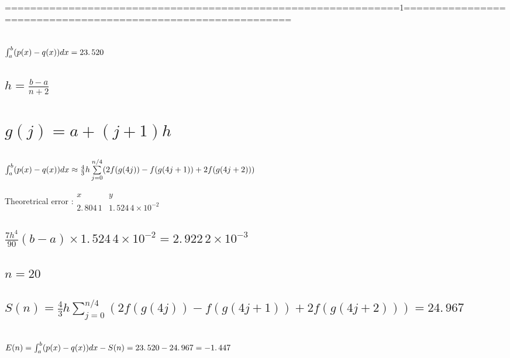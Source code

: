 \documentclass{article}
\begin{document}
\bigskip

\bigskip

==============================================================1=============================================================

\subsection{ $\protect\int_{a}^{b}(p(x)-q(x))dx=\allowbreak 23.\,\allowbreak
520$}

\subsection{$h=\frac{b-a}{n+2}$}

\section{$g(j)=a+(j+1)h$}

\subsection{$\protect\int_{a}^{b}(p(x)-q(x))dx\approx \frac{4}{3}%
h\sum\limits_{j=0}^{n/4}(2f(g(4j))-f(g(4j+1))+2f(g(4j+2)))$}

Theoretrical error :$%
\begin{array}{cc}
x & y \\ 
2.\,\allowbreak 804\,1 & 1.\,\allowbreak 524\,4\times 10^{-2}%
\end{array}%
$

\subsection{$\frac{7h^{4}}{90}(b-a)\times 1.\,\allowbreak 524\,4\times
10^{-2}=\allowbreak 2.\,\allowbreak 922\,2\times 10^{-3}$}

\bigskip 

\subsection{\protect\bigskip $n=20$}

\subsection{$S(n)=\frac{4}{3}h\sum%
\limits_{j=0}^{n/4}(2f(g(4j))-f(g(4j+1))+2f(g(4j+2)))=\allowbreak
24.\,\allowbreak 967$}

\subsection{$E(n)=\protect\int_{a}^{b}(p(x)-q(x))dx\allowbreak \allowbreak
-S(n)=23.\,\allowbreak 520-24.\,\allowbreak 967=\allowbreak -1.\,\allowbreak
447$}
\end{document}
